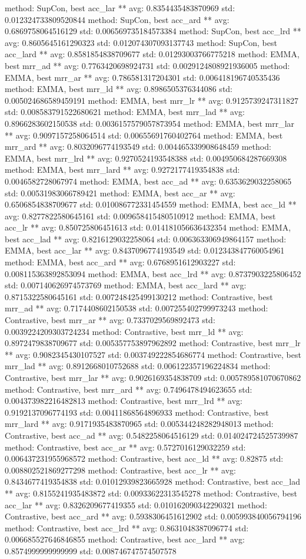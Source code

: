 method: SupCon, best acc_lar ** avg: 0.8354435483870969 std: 0.012324733809520844
method: SupCon, best acc_ard ** avg: 0.6869758064516129 std: 0.006569735184573384
method: SupCon, best acc_lrd ** avg: 0.8605645161290323 std: 0.012074307093137743
method: SupCon, best acc_lard ** avg: 0.8581854838709677 std: 0.01293003766775218
method: EMMA, best mrr_ad ** avg: 0.7763420698924731 std: 0.0029124808921936005
method: EMMA, best mrr_ar ** avg: 0.786581317204301 std: 0.006418196740535436
method: EMMA, best mrr_ld ** avg: 0.8986505376344086 std: 0.005024686589459191
method: EMMA, best mrr_lr ** avg: 0.9125739247311827 std: 0.008583791522680621
method: EMMA, best mrr_lad ** avg: 0.8966283602150538 std: 0.0036157579057873954
method: EMMA, best mrr_lar ** avg: 0.9097157258064514 std: 0.00655691760402764
method: EMMA, best mrr_ard ** avg: 0.8032096774193549 std: 0.004465339908648459
method: EMMA, best mrr_lrd ** avg: 0.9270524193548388 std: 0.004950684287669308
method: EMMA, best mrr_lard ** avg: 0.9272177419354838 std: 0.0046582728067974
method: EMMA, best acc_ad ** avg: 0.6353629032258065 std: 0.00531983066789421
method: EMMA, best acc_ar ** avg: 0.6506854838709677 std: 0.010086772331454559
method: EMMA, best acc_ld ** avg: 0.8277822580645161 std: 0.009658415480510912
method: EMMA, best acc_lr ** avg: 0.850725806451613 std: 0.014181056636432354
method: EMMA, best acc_lad ** avg: 0.8216129032258064 std: 0.006363306949864157
method: EMMA, best acc_lar ** avg: 0.8437096774193549 std: 0.012343847760054961
method: EMMA, best acc_ard ** avg: 0.6768951612903227 std: 0.008115363892853094
method: EMMA, best acc_lrd ** avg: 0.8737903225806452 std: 0.007140626974573769
method: EMMA, best acc_lard ** avg: 0.8715322580645161 std: 0.007248425499130212
method: Contrastive, best mrr_ad ** avg: 0.7174408602150538 std: 0.007255402799973243
method: Contrastive, best mrr_ar ** avg: 0.7337029569892473 std: 0.0039224209303724234
method: Contrastive, best mrr_ld ** avg: 0.8972479838709677 std: 0.005357753897962892
method: Contrastive, best mrr_lr ** avg: 0.9082345430107527 std: 0.003749222854686774
method: Contrastive, best mrr_lad ** avg: 0.8912668010752688 std: 0.006122357196224834
method: Contrastive, best mrr_lar ** avg: 0.9026169354838709 std: 0.005789581070670862
method: Contrastive, best mrr_ard ** avg: 0.7496478494623655 std: 0.004373982216482813
method: Contrastive, best mrr_lrd ** avg: 0.9192137096774193 std: 0.00411868564896933
method: Contrastive, best mrr_lard ** avg: 0.9171935483870965 std: 0.005344248282948013
method: Contrastive, best acc_ad ** avg: 0.5482258064516129 std: 0.014024724525739987
method: Contrastive, best acc_ar ** avg: 0.5727016129032259 std: 0.006437231955968572
method: Contrastive, best acc_ld ** avg: 0.82875 std: 0.008802521869277298
method: Contrastive, best acc_lr ** avg: 0.8434677419354838 std: 0.01012939823665928
method: Contrastive, best acc_lad ** avg: 0.8155241935483872 std: 0.00933622313545278
method: Contrastive, best acc_lar ** avg: 0.8326209677419355 std: 0.010162090342290321
method: Contrastive, best acc_ard ** avg: 0.5938306451612902 std: 0.005993840056794196
method: Contrastive, best acc_lrd ** avg: 0.8631048387096774 std: 0.006685527646846855
method: Contrastive, best acc_lard ** avg: 0.8574999999999999 std: 0.008746747574507578